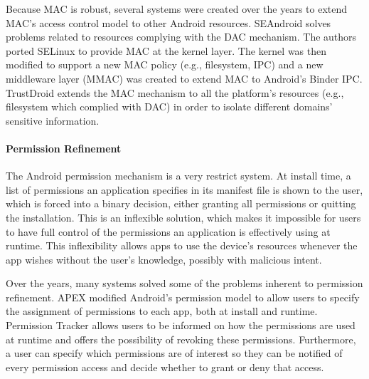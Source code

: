 Because \ac{MAC} is robust, several systems were created over the years to extend \ac{MAC}'s access control model to other Android resources. SEAndroid \cite{smalley2013security} solves problems related to resources complying with the \ac{DAC} mechanism. The authors ported SELinux \cite{peter2001integrating} to provide \ac{MAC} at the kernel layer. The kernel was then modified to support a new \ac{MAC} policy (e.g., filesystem, IPC) and a new middleware layer (MMAC) was created to extend \ac{MAC} to Android's Binder IPC. TrustDroid \cite{bugiel2011practical} extends the \ac{MAC} mechanism to all the platform's resources (e.g., filesystem which complied with DAC) in order to isolate different domains' sensitive information.

\paragraph{\textbf{Permission Refinement}}

The Android permission mechanism is a very restrict system. At install time, a list of permissions an application specifies in its manifest file is shown to the user, which is forced into a binary decision, either granting all permissions or quitting the installation. This is an inflexible solution, which makes it impossible for users to have full control of the permissions an application is effectively using at runtime. This inflexibility allows apps to use the device's resources whenever the app wishes without the user's knowledge, possibly with malicious intent.

Over the years, many systems solved some of the problems inherent to permission refinement. APEX \cite{nauman2010apex} modified Android's permission model to allow users to specify the assignment of permissions to each app, both at install and runtime. Permission Tracker \cite{kern2012permission} allows users to be informed on how the permissions are used at runtime and offers the possibility of revoking these permissions. Furthermore, a user can specify which permissions are of interest so they can be notified of every permission access and decide whether to grant or deny that access.

